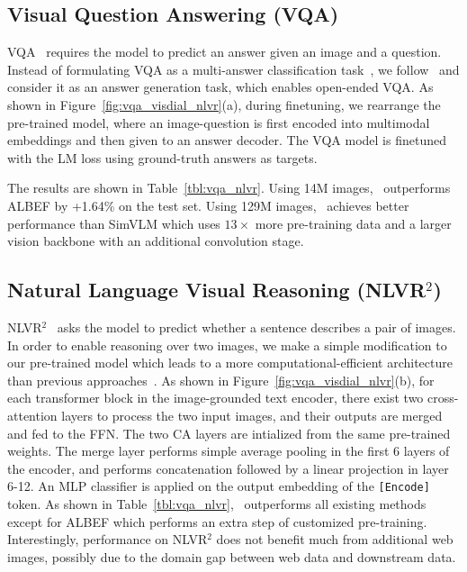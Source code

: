 \vspace{-1ex}
\subsection{Visual Question Answering (VQA)}
\vspace{-0.5ex}





VQA~\cite{VQA} requires the model to predict an answer given an image and a question.
Instead of formulating VQA as a multi-answer classification task~\cite{uniter,oscar},
we follow~\citet{ALBEF} and consider it as an answer generation task,
which enables open-ended VQA.
As shown in Figure~\ref{fig:vqa_visdial_nlvr}(a),
during finetuning,
we rearrange the pre-trained model,
where an image-question is first encoded into multimodal embeddings and then given to an answer decoder.
The VQA model is finetuned with the LM loss using ground-truth answers as targets.

The results are shown in Table~\ref{tbl:vqa_nlvr}.
Using 14M images, \name~outperforms ALBEF by +1.64\% on the test set.
Using 129M images, \name~achieves better performance than SimVLM which uses $13\times$ more pre-training data and a larger vision backbone with an additional convolution stage.

\vspace{-1ex}
\subsection{Natural Language Visual Reasoning (NLVR$^2$)}
\vspace{-0.5ex}
NLVR$^2$~\cite{NLVR} asks the model to predict whether a sentence describes a pair of images.
In order to enable reasoning over two images,
we make a simple modification to our pre-trained model which leads to a more computational-efficient architecture than previous approaches~\cite{ALBEF,simvlm}.
As shown in Figure~\ref{fig:vqa_visdial_nlvr}(b),
for each transformer block in the image-grounded text encoder,
there exist two cross-attention layers to process the two input images,
and their outputs are merged and fed to the FFN.
The two CA layers are intialized from the same pre-trained weights.
The merge layer performs simple average pooling in the first 6 layers of the encoder,
and performs concatenation followed by a linear projection in layer 6-12.
An MLP classifier is applied on the output embedding of the \texttt{[Encode]} token.
As shown in Table~\ref{tbl:vqa_nlvr},
\name~outperforms all existing methods except for ALBEF which performs an extra step of customized pre-training.
Interestingly,
performance on NLVR$^2$ does not benefit much from additional web images,
possibly due to the domain gap between web data and downstream data.



